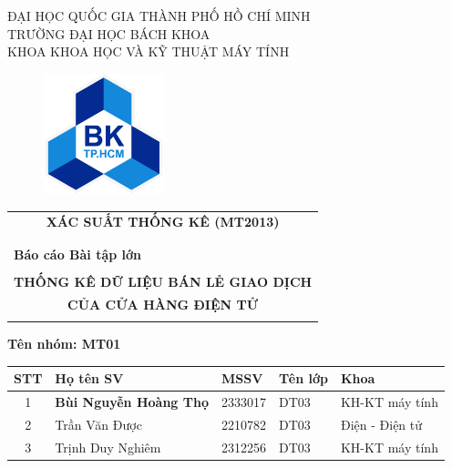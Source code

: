 \documentclass{article}
\begin{document}
\lstset{style=myStyle}
\begin{titlepage}
\begin{center}
    \large ĐẠI HỌC QUỐC GIA THÀNH PHỐ HỒ CHÍ MINH \\
    TRƯỜNG ĐẠI HỌC BÁCH KHOA \\
    KHOA KHOA HỌC VÀ KỸ THUẬT MÁY TÍNH
\end{center}

\vspace{1.5cm}

\begin{figure}[!ht]
    \centering \includegraphics[width=3.5cm]{Images/bachkhoa_logo.png}
\end{figure}

\vspace{1.5cm}

\begin{table}[H]
    \centering
    \begin{tabular}{c}
    {\bf \Large XÁC SUẤT THỐNG KÊ (MT2013)} \\ \\
    \hline  \\
    \multicolumn{1}{l}{{\bf \large Báo cáo Bài tập lớn}}    \\  \\
    {\bf \huge THỐNG KÊ DỮ LIỆU BÁN LẺ GIAO DỊCH}     \\  
    {\bf \huge  CỦA CỬA HÀNG ĐIỆN TỬ}     \\  \\
    \hline
    \end{tabular}
\end{table}

\vspace{1.5cm}

\begin{table}[h]
\centering

\textbf{Tên nhóm: MT01}
\begin{table}[H]
\centering
\begin{tabular}{|c|l|l|l|l|}
\hline
\textbf{STT} & \textbf{Họ tên SV} & \textbf{MSSV} & \textbf{Tên lớp} & \textbf{Khoa} \\
\hline
1 & \textbf{Bùi Nguyễn Hoàng Thọ} & 2333017 & DT03 & KH-KT máy tính \\
\hline
2 & Trần Văn Được & 2210782 & DT03 & Điện - Điện tử \\
\hline
3 & Trịnh Duy Nghiêm & 2312256 & DT03 & KH-KT máy tính \\
\hline


\end{tabular}
\end{table}
\end{table}
\end{titlepage}
\end{document}
